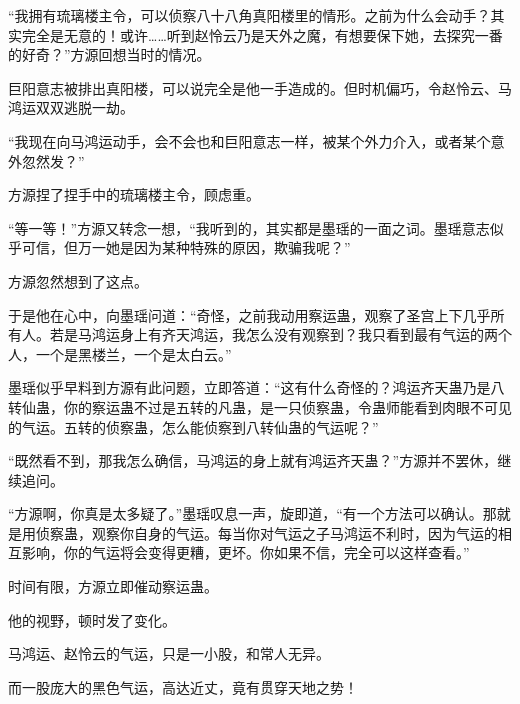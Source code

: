 \begin{this_body}
“我拥有琉璃楼主令，可以侦察八十八角真阳楼里的情形。之前为什么会动手？其实完全是无意的！或许……听到赵怜云乃是天外之魔，有想要保下她，去探究一番的好奇？”方源回想当时的情况。

巨阳意志被排出真阳楼，可以说完全是他一手造成的。但时机偏巧，令赵怜云、马鸿运双双逃脱一劫。

“我现在向马鸿运动手，会不会也和巨阳意志一样，被某个外力介入，或者某个意外忽然发？”

方源捏了捏手中的琉璃楼主令，顾虑重。

“等一等！”方源又转念一想，“我听到的，其实都是墨瑶的一面之词。墨瑶意志似乎可信，但万一她是因为某种特殊的原因，欺骗我呢？”

方源忽然想到了这点。

于是他在心中，向墨瑶问道：“奇怪，之前我动用察运蛊，观察了圣宫上下几乎所有人。若是马鸿运身上有齐天鸿运，我怎么没有观察到？我只看到最有气运的两个人，一个是黑楼兰，一个是太白云。”

墨瑶似乎早料到方源有此问题，立即答道：“这有什么奇怪的？鸿运齐天蛊乃是八转仙蛊，你的察运蛊不过是五转的凡蛊，是一只侦察蛊，令蛊师能看到肉眼不可见的气运。五转的侦察蛊，怎么能侦察到八转仙蛊的气运呢？”

“既然看不到，那我怎么确信，马鸿运的身上就有鸿运齐天蛊？”方源并不罢休，继续追问。

“方源啊，你真是太多疑了。”墨瑶叹息一声，旋即道，“有一个方法可以确认。那就是用侦察蛊，观察你自身的气运。每当你对气运之子马鸿运不利时，因为气运的相互影响，你的气运将会变得更糟，更坏。你如果不信，完全可以这样查看。”

时间有限，方源立即催动察运蛊。

他的视野，顿时发了变化。

马鸿运、赵怜云的气运，只是一小股，和常人无异。

而一股庞大的黑色气运，高达近丈，竟有贯穿天地之势！

\end{this_body}

